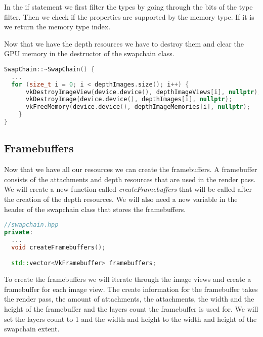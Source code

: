 \documentclass[12pt]{report} \usepackage{preamble}
\begin{document}
In the if statement we first filter the types by going through the bits of the type filter. Then we check if the
properties are supported by the memory type. If it is we return the memory type index.

Now that we have the depth resources we have to destroy them and clear the \ac{GPU} memory in the destructor of the swapchain class.

\begin{lstlisting}[language=C++]
SwapChain::~SwapChain() {
  ...
  for (size_t i = 0; i < depthImages.size(); i++) {
      vkDestroyImageView(device.device(), depthImageViews[i], nullptr);
      vkDestroyImage(device.device(), depthImages[i], nullptr);
      vkFreeMemory(device.device(), depthImageMemories[i], nullptr);
    }
}
\end{lstlisting}

\subsection{Framebuffers}

Now that we have all our resources we can create the framebuffers. A framebuffer consists of the attachments and depth
resources that are used in the render pass. We will create a new function called \textit{createFramebuffers}
that will be called after the creation of the depth resources. We will also need a
new variable in the header of the swapchain class that stores the framebuffers.

\begin{lstlisting}[language=C++]
//swapchain.hpp
private:
  ...
  void createFramebuffers();

  std::vector<VkFramebuffer> framebuffers;
\end{lstlisting}

To create the framebuffers we will iterate through the image views and create a framebuffer for each image view.
The create information for the framebuffer takes the render pass, the amount of attachments, the attachments, the width
and the height of the framebuffer and the layers count the framebuffer is used for. We will set the layers count to 1
and the width and height to the width and height of the swapchain extent.
\end{document}
